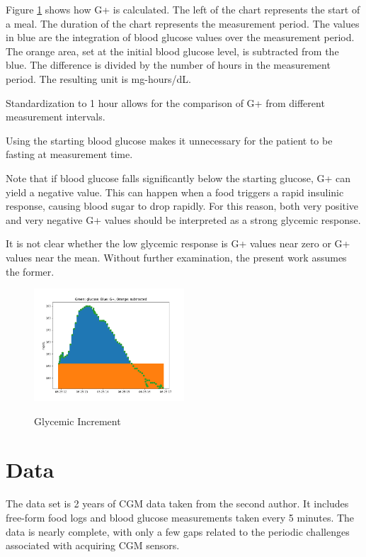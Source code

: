 \documentclass[conference]{IEEEtran}
\begin{document}
Figure \ref{fig:gplus_illustrated} shows how G+ is calculated. The left of the chart represents the start of a meal. The duration of the chart represents the measurement period. The values in blue are the integration of blood glucose values over the measurement period. The orange area, set at the initial blood glucose level, is subtracted from the blue. The difference is divided by the number of hours in the measurement period. The resulting unit is mg-hours/dL.

Standardization to 1 hour allows for the comparison of G+ from different measurement intervals.

Using the starting blood glucose makes it unnecessary for the patient to be fasting at measurement time.

Note that if blood glucose falls significantly below the starting glucose, G+ can yield a negative value. This can happen when a food triggers a rapid insulinic response, causing blood sugar to drop rapidly. For this reason, both very positive and very negative G+ values should be interpreted as a strong glycemic response.

It is not clear whether the low glycemic response is G+ values near zero or G+ values near the mean. Without further examination, the present work assumes the former.

\begin{figure}[tbp]
    \includegraphics[width=0.5\textwidth]{images/gplus_illustrated.png}
    \label{fig:gplus_illustrated}
    \caption{Glycemic Increment}
\end{figure}

\section{Data}

The data set is 2 years of CGM data taken from the second author. It includes free-form food logs and blood glucose measurements taken every 5 minutes. The data is nearly complete, with only a few gaps related to the periodic challenges associated with acquiring CGM sensors.
\end{document}
